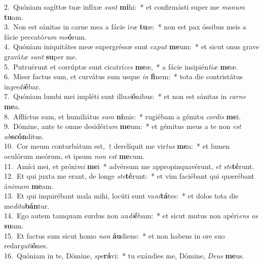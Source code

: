 {2.~}Quóniam sagíttæ tuæ infíxæ \textit{sunt} \textbf{mi}hi:~* et confirmásti super me \textit{ma}\textit{num} \textbf{tu}am.\\
{3.~}Non est sánitas in carne mea a fácie i\textit{ræ} \textbf{tu}æ:~* non est pax óssibus meis a fácie peccató\textit{rum} \textit{me}\textbf{ó}rum.\\
{4.~}Quóniam iniquitátes meæ supergréssæ sunt ca\textit{put} \textbf{me}um:~* et sicut onus grave gravá\textit{tæ} \textit{sunt} \textbf{su}per me.\\
{5.~}Putruérunt et corrúptæ sunt cicatrí\textit{ces} \textbf{me}æ,~* a fácie insipién\textit{ti}\textit{æ} \textbf{me}æ.\\
{6.~}Miser factus sum, et curvátus sum usque \textit{in} \textbf{fi}nem:~* tota die contristátus in\textit{gre}\textit{di}\textbf{é}bar.\\
{7.~}Quóniam lumbi mei impléti sunt illu\textit{si}\textbf{ó}nibus:~* et non est sánitas in \textit{car}\textit{ne} \textbf{me}a.\\
{8.~}Afflíctus sum, et humiliátus \textit{sum} \textbf{ni}mis:~* rugiébam a gémitu \textit{cor}\textit{dis} \textbf{me}i.\\
{9.~}Dómine, ante te omne desidéri\textit{um} \textbf{me}um:~* et gémitus meus a te non \textit{est} \textit{ab}\textbf{scón}ditus.\\
{10.~}Cor meum conturbátum est,~† derelíquit me vir\textit{tus} \textbf{me}a:~* et lumen oculórum meórum, et ipsum \textit{non} \textit{est} \textbf{me}cum.\\
{11.~}Amíci mei, et próxi\textit{mi} \textbf{me}i~* advérsum me appropinquavérunt, \textit{et} \textit{ste}\textbf{té}runt.\\
{12.~}Et qui juxta me erant, de longe \textit{ste}\textbf{té}runt:~* et vim faciébant qui quærébant á\textit{ni}\textit{mam} \textbf{me}am.\\
{13.~}Et qui inquirébant mala mihi, locúti sunt va\textit{ni}\textbf{tá}tes:~* et dolos tota die me\textit{di}\textit{ta}\textbf{bán}tur.\\
{14.~}Ego autem tamquam surdus non au\textit{di}\textbf{é}bam:~* et sicut mutus non apéri\textit{ens} \textit{os} \textbf{su}um.\\
{15.~}Et factus sum sicut homo \textit{non} \textbf{áu}diens:~* et non habens in ore suo redar\textit{gu}\textit{ti}\textbf{ó}nes.\\
{16.~}Quóniam in te, Dómine, \textit{spe}\textbf{rá}vi:~* tu exáudies me, Dómine, \textit{De}\textit{us} \textbf{me}us.\\
